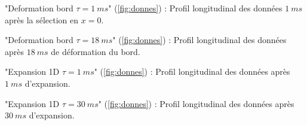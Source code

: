\documentclass[a3, 10pt,twoside]{article}          %
\theoremstyle{plain}
\theoremstyle{definition}
\theoremstyle{remark}
\theoremstyle{definition} %
\def\OliveGreen{OliveGreen}
\begin{document}
\begin{minipage}[b]{0.45\textwidth}
    \begin{enumerate}[label=\alph*)]
        {\color{blue} \item \color{blue} "Deformation bord $\tau = 1~ms$" (\ref{fig:donnes}) : Profil longitudinal des données $1~ms$ après la sélection en $x = 0$.}
        {\color{orange}\item "Deformation bord $\tau = 18~ms$" (\ref{fig:donnes}) : Profil longitudinal des données après $18~ms$ de déformation du bord.}
        {\color{\OliveGreen} \item "Expansion 1D $\tau = 1~ms$" (\ref{fig:donnes}) : Profil longitudinal des données après $1~ms$ d'expansion.}
        {\color{red} \item "Expansion 1D $\tau = 30~ms$" (\ref{fig:donnes}) : Profil longitudinal des données après $30~ms$ d'expansion.}
    \end{enumerate}
  \end{minipage}
  \hfill %
\end{document}
